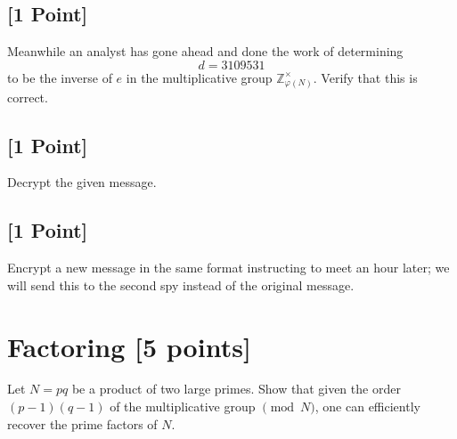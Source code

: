 \documentclass[11pt]{article}
\begin{document}
\subsection{[1 Point]} Meanwhile an analyst has gone ahead and done the work of determining 
\[
d = 3109531
\]
to be the inverse of $e$ in the multiplicative group $\mathbb{Z}_{\varphi(N)}^\times$. Verify that this is correct.




\subsection{[1 Point]} Decrypt the given message.




\subsection{[1 Point]} Encrypt a new message in the same format instructing to meet an hour later; we will send this to the second spy instead of the original message.



\section{Factoring [5 points]}
Let $N=pq$ be a product of two large primes.  Show that given the order $(p-1)(q-1)$ of the multiplicative group $\pmod{N}$, one can efficiently recover the prime factors of $N$.
\end{document}
